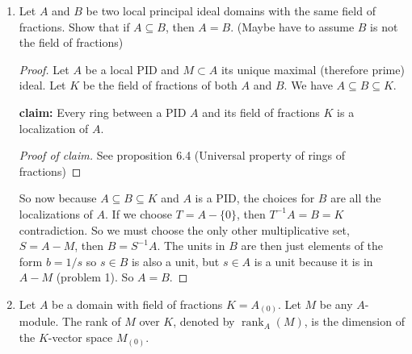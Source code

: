 \documentclass[hidelinks,12pt]{article}
\begin{document}
\begin{enumerate}
\begin{proof}
\begin{align*}
                            &=\left\{\sum_{j=1}^{n}a_{j}m_{j}\mid a_{j}\in A,\ m_{j}\in M,\ n\in N\right\}
            \end{align*}
            Let \(x\in M\), then \(x\) is a linear combination of the basis \(\{m_{1},\dots,m_{n}\}\) with coefficients from \(\mathcal{M}\) and with coefficients from \(A\):
            \begin{align*}
                x&=\mu_{1}m_{1}+\mu_{2}m_{2}+\dots+\mu_{n}m_{n}\\
                x&=a_{1}m_{1}+a_{2}m_{2}+\dots+a_{n}m_{n}\\
                \implies 0&=(a_{1}-\mu_{1})m_{1}+\dots+(a_{n}-\mu_{n})m_{n}\\
            \end{align*}
            Since \(\{m_{1},\dots,m_{n}\}\) is a basis, we have either \((a_{i}-\mu_{i})=0\) or \(m_{i}=0\) for all \(i\in\{1,\dots,n\}\). However, by problem 1, any element of the form \(a+m\) for \(a\in A\) and \(m\in\mathcal{M}\) is a unit, so \(a_{i}-\mu_{i}\neq0\) which means \(m_{i}=0\) for all \(i\), and so \(M=(0)\).
        \end{proof}
    \item Let \(A\) and \(B\) be two local principal ideal domains with the same field of fractions. Show that if \(A\subseteq B\), then \(A=B\). (Maybe have to assume \(B\) is not the field of fractions)
        \begin{proof}
            Let \(A\) be a local PID and \(M\subset A\) its unique maximal (therefore prime) ideal. Let \(K\) be the field of fractions of both \(A\) and \(B\). We have \(A\subseteq B\subseteq K\).\par \textbf{claim:} Every ring between a PID \(A\) and its field of fractions \(K\) is a localization of \(A\). \begin{proof}[Proof of claim]
                See proposition 6.4 (Universal property of rings of fractions)  
            \end{proof}
            So now because \(A\subseteq B\subseteq K\) and \(A\) is a PID, the choices for \(B\) are all the localizations of \(A\). If we choose \(T=A-\{0\}\), then \(T^{-1}A=B=K\) contradiction. So we must choose the only other multiplicative set, \(S=A-M\), then \(B=S^{-1}A\). The units in \(B\) are then just elements of the form \(b=1/s\) so \(s\in B\) is also a unit, but \(s\in A\) is a unit because it is in \(A-M\) (problem 1). So \(A=B\).
        \end{proof}
    \item Let \(A\) be a domain with field of fractions \(K=A_{(0)}\). Let \(M\) be any \(A\)-module. The rank of \(M\) over \(K\), denoted by \(\operatorname{rank}_{A}(M)\), is the dimension of the \(K\)-vector space \(M_{(0)}\).

\end{enumerate}
\end{document}
